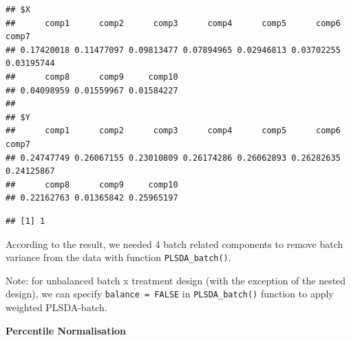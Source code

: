 \documentclass[
]{book}
\newenvironment{Shaded}{\begin{snugshade}}{\end{snugshade}}
\newcommand{\AttributeTok}[1]{\textcolor[rgb]{0.77,0.63,0.00}{#1}}
\newcommand{\DecValTok}[1]{\textcolor[rgb]{0.00,0.00,0.81}{#1}}
\newcommand{\FunctionTok}[1]{\textcolor[rgb]{0.00,0.00,0.00}{#1}}
\newcommand{\NormalTok}[1]{#1}
\newcommand{\OtherTok}[1]{\textcolor[rgb]{0.56,0.35,0.01}{#1}}
\newcommand{\SpecialCharTok}[1]{\textcolor[rgb]{0.00,0.00,0.00}{#1}}
\begin{document}
\begin{verbatim}
## $X
##      comp1      comp2      comp3      comp4      comp5      comp6      comp7 
## 0.17420018 0.11477097 0.09813477 0.07894965 0.02946813 0.03702255 0.03195744 
##      comp8      comp9     comp10 
## 0.04098959 0.01559967 0.01584227 
## 
## $Y
##      comp1      comp2      comp3      comp4      comp5      comp6      comp7 
## 0.24747749 0.26067155 0.23010809 0.26174286 0.26062893 0.26282635 0.24125867 
##      comp8      comp9     comp10 
## 0.22162763 0.01365842 0.25965197
\end{verbatim}

\begin{Shaded}
\end{Shaded}

\begin{verbatim}
## [1] 1
\end{verbatim}

According to the result, we needed 4 batch related components to remove batch variance from the data with function \texttt{PLSDA\_batch()}.

\begin{Shaded}
\end{Shaded}

Note: for unbalanced batch x treatment design (with the exception of the nested design), we can specify \texttt{balance\ =\ FALSE} in \texttt{PLSDA\_batch()} function to apply weighted PLSDA-batch.

\textbf{Percentile Normalisation}
\end{document}
